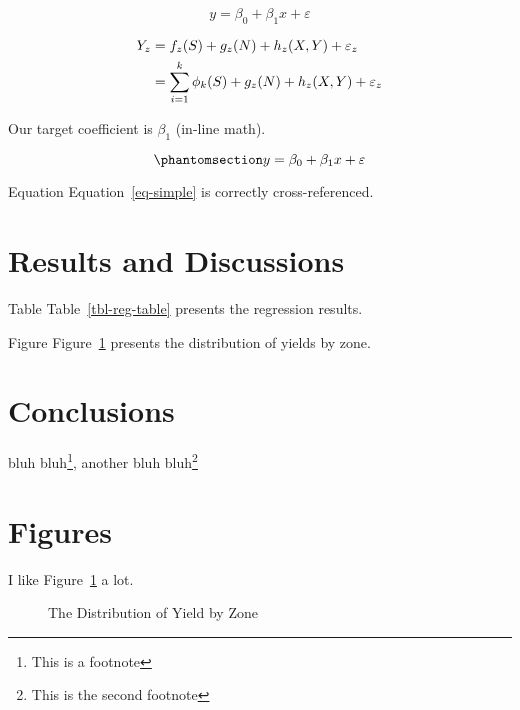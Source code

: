 \documentclass[
]{article}
\begin{document}
\begin{equation}
y = \beta_0 + \beta_1 x + \varepsilon \label{eq-equation}
\end{equation}

\begin{align}
Y_z & = f_z(S) + g_z(N) + h_z(X,Y) + \varepsilon_z \notag \\
& = \sum_{i=1}^k \phi_k(S) + g_z(N) + h_z(X,Y) + \varepsilon_z \label{eq-align}
\end{align}

Our target coefficient is \(\beta_1\) (in-line math).

\begin{equation}\phantomsection\label{eq-simple}{
y = \beta_0 + \beta_1 x + \varepsilon 
}\end{equation}

Equation Equation~\ref{eq-simple} is correctly cross-referenced.

\section{Results and Discussions}\label{results-and-discussions}

Table Table~\ref{tbl-reg-table} presents the regression results.

Figure Figure~\ref{fig-yield-dist} presents the distribution of yields
by zone.

\section{Conclusions}\label{conclusions}

bluh bluh\footnote{This is a footnote}, another bluh bluh\footnote{This
  is the second footnote}

\section{Figures}\label{figures}

I like Figure~\ref{fig-yield-dist} a lot.

\begin{figure}


\caption{\label{fig-yield-dist}The Distribution of Yield by Zone}

\end{figure}%
\end{document}
